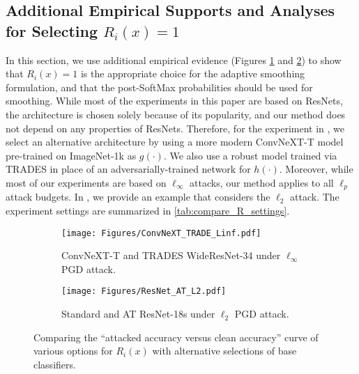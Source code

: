 \documentclass[11pt, letterpaper]{article}
\theoremstyle{plain}
\theoremstyle{definition}
\begin{document}
\subsection{Additional Empirical Supports and Analyses for Selecting $R_i (x) = 1$} \label{sec:more_compare_R}

In this section, we use additional empirical evidence (Figures \ref{fig:compare_R_2a} and \ref{fig:compare_R_2b}) to show that $R_i (x) = 1$ is the appropriate choice for the adaptive smoothing formulation, and that the post-SoftMax probabilities should be used for smoothing. While most of the experiments in this paper are based on ResNets, the architecture is chosen solely because of its popularity, and our method does not depend on any properties of ResNets. Therefore, for the experiment in , we select an alternative architecture by using a more modern ConvNeXT-T model \citep{Liu22} pre-trained on ImageNet-1k as $g (\cdot)$. We also use a robust model trained via TRADES in place of an adversarially-trained network for $h (\cdot)$. Moreover, while most of our experiments are based on $\ell_\infty$ attacks, our method applies to all $\ell_p$ attack budgets. In , we provide an example that considers the $\ell_2$ attack. The experiment settings are summarized in \cref{tab:compare_R_settings}.

\begin{figure}[t]
	\centering
	\begin{subfigure}[t]{.48\textwidth}
		\captionsetup{justification=centering}
		\centering
		\texttt{[image: Figures/ConvNeXT\_TRADE\_Linf.pdf]}
		\vspace*{-2mm}
		\caption{\footnotesize ConvNeXT-T and TRADES WideResNet-34 under $\ell_\infty$ PGD attack.}
		\label{fig:compare_R_2a}
	\end{subfigure}
	\hspace{4mm}
	\begin{subfigure}[t]{.48\textwidth}
		\captionsetup{justification=centering}
		\centering
		\texttt{[image: Figures/ResNet\_AT\_L2.pdf]}
		\vspace*{-2mm}
		\caption{\footnotesize Standard and AT ResNet-18s under $\ell_2$ PGD attack.}
		\label{fig:compare_R_2b}
	\end{subfigure}
	
	\vspace{-4.5mm}
	\caption{Comparing the ``attacked accuracy versus clean accuracy'' curve of various options for $R_i (x)$ with alternative selections of base classifiers.}
	\label{fig:compare_R_2}
\end{figure}
\end{document}
